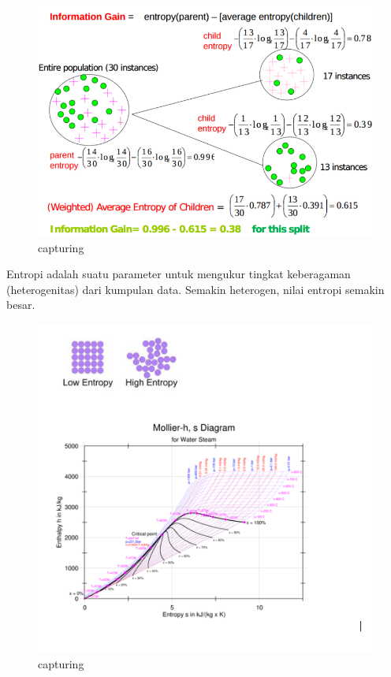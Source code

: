 \begin{enumerate}
\begin{itemize}
\begin{figure}[ht]
\centering
\includegraphics[scale=0.5]{figures/Chapter2-AnnisaFathoroni7.png}
\caption{capturing}
\label{contoh}
\end{figure}

Entropi adalah suatu parameter untuk mengukur tingkat keberagaman (heterogenitas) dari kumpulan data. Semakin heterogen, nilai entropi semakin besar. 
\begin{figure}[ht]
\centering
\includegraphics[scale=0.5]{figures/Chapter2-AnnisaFathoroni8.png}
\caption{capturing}
\label{contoh}
\end{figure}

\end{itemize}
\end{enumerate}